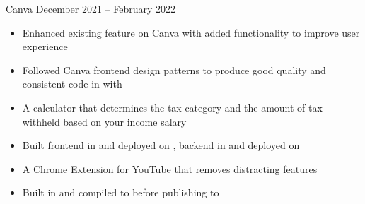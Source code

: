 \documentclass[paper=a4,fontsize=10pt]{resume}
\begin{document}
{		\divider

			{Canva}
			{December 2021 -- February 2022}
		\begin{itemize}
			\item Enhanced existing feature on Canva with added functionality to improve user experience
			\item Followed Canva frontend design patterns to produce good quality and consistent code in  with 
		\end{itemize}

		\begin{itemize}
			\item A calculator that determines the tax category and the amount of tax withheld based on your income salary
			\item Built frontend in  and deployed on , backend in  and deployed on 
		\end{itemize}

		\divider

		\begin{itemize}
			\item A Chrome Extension for YouTube that removes distracting features
			\item Built in  and compiled to  before publishing to 
		\end{itemize}
}

\makebody
\end{document}
